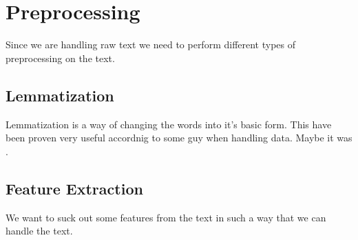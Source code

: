 \section{Preprocessing}
Since we are handling raw text we need to perform different types of
preprocessing on the text.  \subsection{Lemmatization} Lemmatization is a way
of changing the words into it's basic form. This have been proven very useful
accordnig to some guy when handling data. Maybe it was
\cite{tretyakov2004machine}.
\subsection{Feature Extraction}
We want to suck out some features from the text in such a way that we can handle the text.
